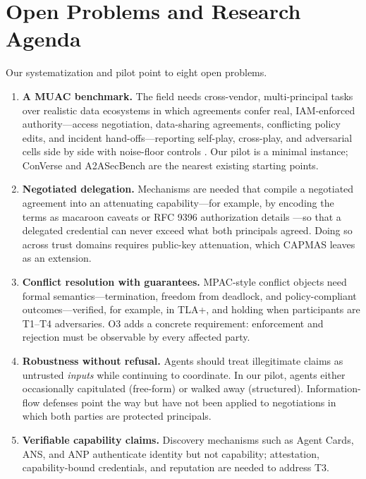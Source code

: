 \documentclass[conference]{IEEEtran}
\providecommand{\tightlist}{\setlength{\itemsep}{0pt}\setlength{\parskip}{0pt}}
\begin{document}
\section{Open Problems and Research Agenda}\label{sec-9}

Our systematization and pilot point to eight open problems.

\begin{enumerate}
\def\labelenumi{\arabic{enumi}.}
\tightlist
\item
  \textbf{A MUAC benchmark.} The field needs cross-vendor, multi-principal tasks over realistic data ecosystems in which agreements confer real, IAM-enforced authority---access negotiation, data-sharing agreements, conflicting policy edits, and incident hand-offs---reporting self-play, cross-play, and adversarial cells side by side with noise-floor controls \cite{kaliyev2026noisefloor}. Our pilot is a minimal instance; ConVerse \cite{gomaa2025converse} and A2ASecBench \cite{li2026a2asecbench} are the nearest existing starting points.
\item
  \textbf{Negotiated delegation.} Mechanisms are needed that compile a negotiated agreement into an attenuating capability---for example, by encoding the terms as macaroon caveats \cite{birgisson2014macaroons, veski2026capmas} or RFC 9396 authorization details \cite{rfc9396}---so that a delegated credential can never exceed what both principals agreed. Doing so across trust domains requires public-key attenuation, which CAPMAS leaves as an extension.
\item
  \textbf{Conflict resolution with guarantees.} MPAC-style conflict objects need formal semantics---termination, freedom from deadlock, and policy-compliant outcomes---verified, for example, in TLA+, and holding when participants are T1--T4 adversaries. O3 adds a concrete requirement: enforcement and rejection must be observable by every affected party.
\item
  \textbf{Robustness without refusal.} Agents should treat illegitimate claims as untrusted \emph{inputs} while continuing to coordinate. In our pilot, agents either occasionally capitulated (free-form) or walked away (structured). Information-flow defenses \cite{debenedetti2026camel, abdelnabi2026firewalls} point the way but have not been applied to negotiations in which both parties are protected principals.
\item
  \textbf{Verifiable capability claims.} Discovery mechanisms such as Agent Cards, ANS, and ANP authenticate identity but not capability; attestation, capability-bound credentials, and reputation \cite{sabater2005review, huynh2006fire} are needed to address T3.

\end{enumerate}
\end{document}

